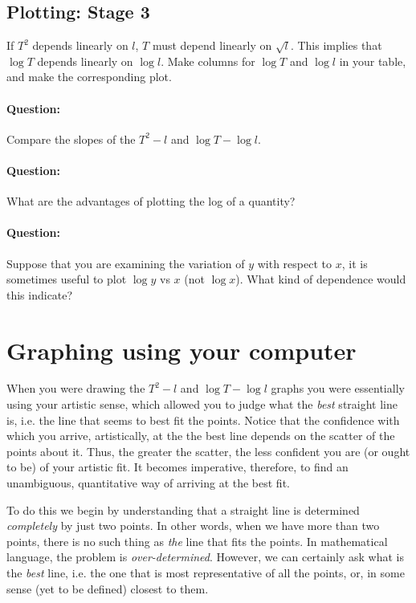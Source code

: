 \subsection{Plotting: Stage 3}

If $T^2$ depends linearly on $l$, $T$ must depend linearly on $\sqrt{l}$. This implies that $\log T$ depends linearly on $\log l$. Make columns for $\log T$ and $\log l$ in your table, and make the corresponding plot. 

\begin{question}
\paragraph{Question:} Compare the slopes of the $T^2 - l$ and $\log T - \log l$. ~\\

\paragraph{Question:} What are the advantages of plotting the log of a quantity?~\\

\paragraph{Question:} Suppose that you are examining the variation of $y$ with respect to $x$, it is sometimes useful to plot $\log y$ vs $x$ (not $\log x$). What kind of dependence would this indicate?

\end{question}

\section{Graphing using your computer}

When you were drawing the $T^2 - l$ and $\log T - \log l$ graphs you were essentially using your artistic sense, which allowed you to judge what the \textit{best} straight line is, i.e. the line that seems to best fit the points. Notice that the confidence with which you arrive, artistically, at the the best line depends on the scatter of the points about it. Thus, the greater the scatter, the less confident you are (or ought to be) of your artistic fit. It becomes imperative, therefore, to find an unambiguous, quantitative way of arriving at the best fit. 

To do this we begin by understanding that a straight line is determined \textit{completely} by just two points. In other words, when we have more than two points, there is no such thing as \textit{the} line that fits the points. In mathematical language, the problem is \textit{over-determined}. However, we can certainly ask what is the \textit{best} line, i.e. the one that is most representative of all the points, or, in some sense (yet to be defined) closest to them.

